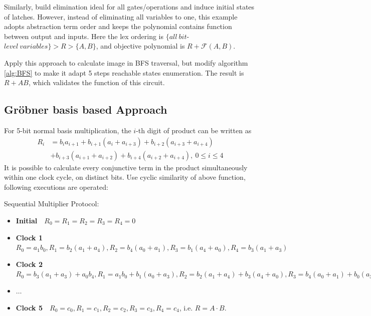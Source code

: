 Similarly, build elimination ideal for all gates/operations and induce
initial states of latches. However, instead of eliminating all variables
to one, this example adopts abstraction term order
and keeps the polynomial contains function between output and inputs.
Here the lex ordering is $\{all\ bit$-$level\ variables\} > R > \{A, B\}$, and objective
polynomial is $R + \mathcal{F}(A, B)$.

Apply this approach to calculate image in BFS traversal, but modify algorithm
\ref{alg:BFS} to make it adapt 5 steps reachable states enumeration.
The result is $R + AB$, which validates the function of this circuit.

\subsection{Gr\"obner basis based Approach}
\label{sec:SMPOexperiment}

For 5-bit normal basis multiplication, the $i$-th digit of product can be written as
\begin{align}
R_i &= b_ia_{i+1} + b_{i+1}(a_i + a_{i+3}) + b_{i+2}(a_{i+3} + a_{i+4}) \nonumber\\
&+ b_{i+3}(a_{i+1} + a_{i+2}) + b_{i+4}
(a_{i+2} + a_{i+4}),\ 0\leq i\leq 4 \nonumber
\end{align}
It is possible to calculate every conjunctive term in the product simultaneously within one clock cycle,
on distinct bits. 
Use cyclic similarity of above function, following executions are operated: 
\begin{Example}
Sequential Multiplier Protocol:
\begin{itemize}
\item \textbf{Initial}\ \ $R_0 = R_1 = R_2 = R_3 = R_4 = 0$
\item \textbf{Clock 1}\ \ $R_0 = a_1b_0, R_1 = b_2(a_1 + a_4), R_2 = b_4(a_0 + a_1), R_3 = b_1(a_4 + a_0), 
			R_4 = b_3(a_1 + a_3)$
\item \textbf{Clock 2}\ \ $R_0 = b_3(a_1 + a_3) + a_0b_4, R_1 = a_1b_0 + b_1(a_0 + a_3), R_2 = b_2(a_1 + a_4)
			+ b_3(a_4 + a_0), R_3 = b_4(a_0 + a_1) + b_0(a_3 + a_4), R_4 = b_1(a_4 + a_0) + b_2(a_0 + a_2)$
\item \textbf{$\dots$}
\item \textbf{Clock 5}\ \ $R_0 = c_0, R_1 = c_1, R_2 = c_2, R_3 = c_3, R_4 = c_4$, i.e. $R = A\cdot B$.
\end{itemize}
\end{Example}

